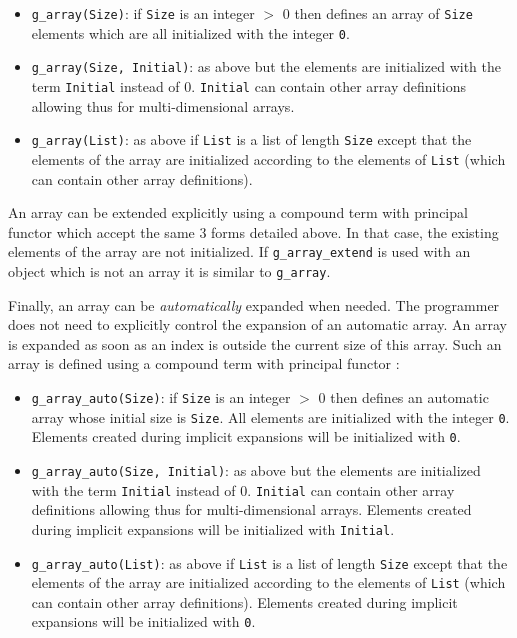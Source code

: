 \begin{itemize}

\item \texttt{g\_array(Size)}: if \texttt{Size} is an integer $>$ 0 then
defines an array of \texttt{Size} elements which are all initialized with
the integer \texttt{0}.

\item \texttt{g\_array(Size, Initial)}: as above but the elements are
initialized with the term \texttt{Initial} instead of 0. \texttt{Initial}
can contain other array definitions allowing thus for multi-dimensional
arrays.

\item \texttt{g\_array(List)}: as above if \texttt{List} is a list of length
\texttt{Size} except that the elements of the array are initialized
according to the elements of \texttt{List} (which can contain other array
definitions).

\end{itemize}

An array can be extended explicitly using a compound term with principal
functor  which accept the same 3 forms detailed
above. In that case, the existing elements of the array are not
initialized. If \texttt{g\_array\_extend} is used with an object which is not
an array it is similar to \texttt{g\_array}.

Finally, an array can be \textit{automatically} expanded when needed. The
programmer does not need to explicitly control the expansion of an automatic
array. An array is expanded as soon as an index is outside the current size
of this array. Such an array is defined using a compound term with principal
functor :

\begin{itemize}

\item \texttt{g\_array\_auto(Size)}: if \texttt{Size} is an integer $>$ 0
then defines an automatic array whose initial size is \texttt{Size}. All
elements are initialized with the integer \texttt{0}. Elements
created during implicit expansions will be initialized with \texttt{0}.

\item \texttt{g\_array\_auto(Size, Initial)}: as above but the elements are
initialized with the term \texttt{Initial} instead of 0. \texttt{Initial} can
contain other array definitions allowing thus for multi-dimensional
arrays. Elements created during implicit expansions will be initialized with
\texttt{Initial}.

\item \texttt{g\_array\_auto(List)}: as above if \texttt{List} is a list of
length \texttt{Size} except that the elements of the array are initialized
according to the elements of \texttt{List} (which can contain other array
definitions). Elements created during implicit expansions will be initialized
with \texttt{0}.

\end{itemize}

